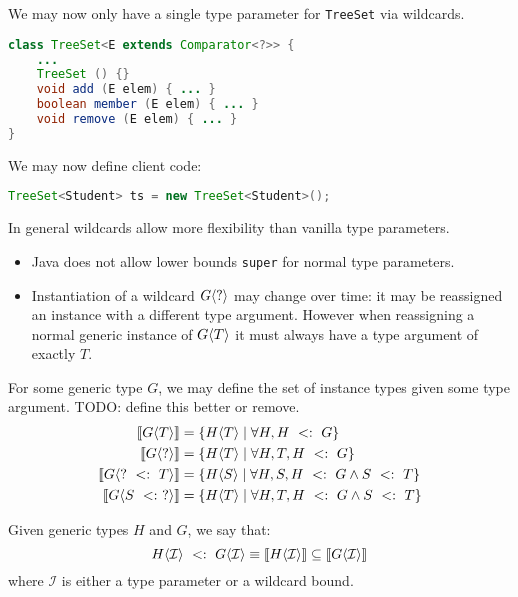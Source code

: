 \documentclass{article}
\begin{document}
\begin{example}
We may now only have a single type parameter for \texttt{TreeSet} via wildcards.
\begin{lstlisting}[language=Java]
class TreeSet<E extends Comparator<?>> {
    ...
    TreeSet () {}
    void add (E elem) { ... }
    boolean member (E elem) { ... }
    void remove (E elem) { ... }
}
\end{lstlisting}
We may now define client code:
\begin{lstlisting}[language=Java]
TreeSet<Student> ts = new TreeSet<Student>();
\end{lstlisting}
\end{example}

In general wildcards allow more flexibility than vanilla type parameters.
\begin{itemize}
\item Java does not allow lower bounds \texttt{super} for normal type parameters.
\item Instantiation of a wildcard $G \langle ? \rangle$ may change over time: it may be reassigned an instance with a different type argument. However when reassigning a normal generic instance of $G \langle T \rangle$ it must always have a type argument of exactly $T$.
\end{itemize}

For some generic type $G$, we may define the set of instance types given some type argument.
TODO: define this better or remove.
\begin{align}
\llbracket G \langle T \rangle \rrbracket &= \{ H \langle T \rangle \mid \forall H, H ~ <: ~ G \} \\
\llbracket G \langle ? \rangle \rrbracket &= \{ H \langle T \rangle \mid \forall H, T, H ~ <: ~ G \} \\
\llbracket G \langle ? ~ <: ~ T \rangle \rrbracket &= \{ H \langle S \rangle \mid \forall H, S, H ~ <: ~ G \wedge S ~ <: ~ T \} \\
\llbracket G \langle S ~ <: ~ ? \rangle \rrbracket &= \{ H \langle T \rangle \mid \forall H, T, H ~ <: ~ G \wedge S ~ <: ~ T \}
\end{align}

\begin{definition}
Given generic types $H$ and $G$, we say that:
$$H \langle \mathcal{I} \rangle ~ <: ~ G \langle \mathcal{I} \rangle \equiv \llbracket H \langle \mathcal{I} \rangle \rrbracket \subseteq \llbracket G \langle \mathcal{I} \rangle \rrbracket $$
where $\mathcal{I}$ is either a type parameter or a wildcard bound.
\end{definition}
\end{document}
